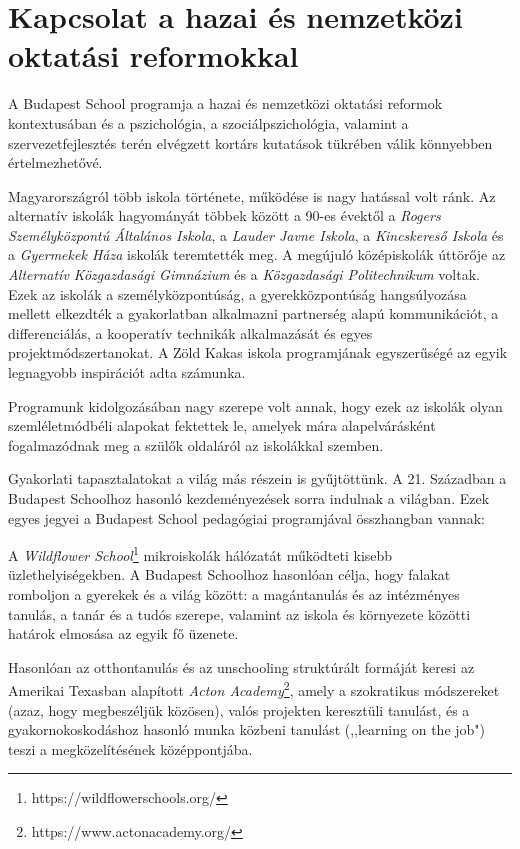 \section{Kapcsolat a hazai és nemzetközi oktatási reformokkal}
\label{sec:kapcsolat_reformokkal}

A Budapest School programja a hazai és nemzetközi oktatási reformok kontextusában és a pszichológia, a szociálpszichológia, valamint a szervezetfejlesztés terén elvégzett kortárs kutatások tükrében válik könnyebben értelmezhetővé.

Magyarországról több iskola története, működése is nagy hatással volt ránk. Az alternatív iskolák hagyományát többek között a 90-es évektől a \emph{Rogers Személyközpontú Általános Iskola}, a \emph{Lauder Javne Iskola}, a \emph{Kincskereső Iskola} és a \emph{Gyermekek Háza} iskolák teremtették meg. A megújuló középiskolák úttörője az \emph{Alternatív Közgazdasági Gimnázium} és a \emph{Közgazdasági Politechnikum} voltak. Ezek az iskolák a személyközpontúság, a gyerekközpontúság hangsúlyozása mellett elkezdték a gyakorlatban alkalmazni partnerség alapú kommunikációt, a differenciálás, a kooperatív technikák alkalmazását és egyes projektmódszertanokat. A Zöld Kakas iskola programjának egyszerűségé az egyik legnagyobb inspirációt adta számunka.

Programunk kidolgozásában nagy szerepe volt annak, hogy ezek az iskolák olyan szemléletmódbéli alapokat fektettek le, amelyek mára alapelvárásként fogalmazódnak meg a szülők oldaláról az iskolákkal szemben.

Gyakorlati tapasztalatokat a világ más részein is gyűjtöttünk. A 21. Században a Budapest Schoolhoz hasonló kezdeményezések sorra indulnak a világban. Ezek egyes jegyei a Budapest School pedagógiai programjával összhangban vannak:

A \emph{Wildflower School}\footnote{https://wildflowerschools.org/} mikroiskolák hálózatát működteti kisebb üzlethelyiségekben. A Budapest Schoolhoz hasonlóan célja, hogy falakat romboljon a gyerekek és a világ között: a magántanulás és az intézményes tanulás, a tanár és a tudós szerepe, valamint az iskola és környezete közötti határok elmosása az egyik fő üzenete.

Hasonlóan az otthontanulás és az  unschooling struktúrált formáját keresi az Amerikai Texasban alapított \emph{Acton Academy}\footnote{https://www.actonacademy.org/}, amely a szokratikus módszereket (azaz, hogy megbeszéljük közösen), valós projekten keresztüli tanulást, és a gyakornokoskodáshoz hasonló munka közbeni tanulást (,,learning on the job") teszi a megközelítésének középpontjába.

